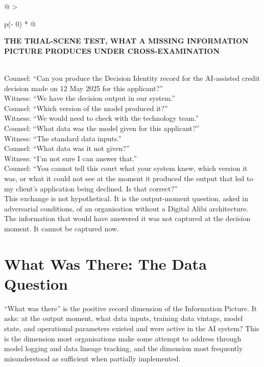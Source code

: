 \begin{longtable}[]{@{}
  >{\raggedright\arraybackslash}p{(\columnwidth - 0\tabcolsep) * }@{}}
\toprule\noalign{}
\begin{minipage}[b]{\linewidth}\raggedright
\textbf{THE TRIAL-SCENE TEST, WHAT A MISSING INFORMATION PICTURE PRODUCES UNDER CROSS-EXAMINATION}
\end{minipage} \\
\midrule\noalign{}
\endhead
\bottomrule\noalign{}
\endlastfoot
Counsel: ``Can you produce the Decision Identity record for the AI-assisted credit decision made on 12 May 2025 for this applicant?'' \\
Witness: ``We have the decision output in our system.'' \\
Counsel: ``Which version of the model produced it?'' \\
Witness: ``We would need to check with the technology team.'' \\
Counsel: ``What data was the model given for this applicant?'' \\
Witness: ``The standard data inputs.'' \\
Counsel: ``What data was it not given?'' \\
Witness: ``I'm not sure I can answer that.'' \\
Counsel: ``You cannot tell this court what your system knew, which version it was, or what it could not see at the moment it produced the output that led to my client's application being declined. Is that correct?'' \\
This exchange is not hypothetical. It is the output-moment question, asked in adversarial conditions, of an organisation without a Digital Alibi architecture. The information that would have answered it was not captured at the decision moment. It cannot be captured now. \\
\end{longtable}

\scenebreak

\section{What Was There: The Data Question}

``What was there'' is the positive record dimension of the Information Picture. It asks: at the output moment, what data inputs, training data vintage, model state, and operational parameters existed and were active in the AI system? This is the dimension most organisations make some attempt to address through model logging and data lineage tracking, and the dimension most frequently misunderstood as sufficient when partially implemented.

